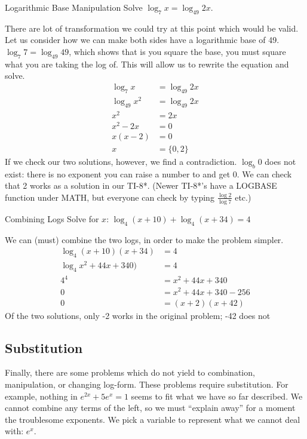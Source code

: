 \begin{example}{Logarithmic Base Manipulation}
\exProblem
Solve $\log_7{x} = \log_{49}{2x}$.

\exSolution
There are lot of transformation we could try at this point which would be valid.
Let us consider how we can make both sides have a logarithmic base of 49.
$\log_7{7} = \log_{49}{49}$, which shows that is you square the base, you must square
what you are taking the log of.  This will allow us to rewrite the equation and solve.
\begin{align*}
	\log_7{x} &= \log_{49}{2x}\\
	\log_{49}{x^2} &= \log_{49}{2x}\\
	x^2 &= 2x \\
	x^2 - 2x &= 0\\
	x(x-2) &= 0\\
	x &= \{0, 2\}
\end{align*}
If we check our two solutions, however, we find a contradiction.  $\log_b{0}$ does
not exist: there is no exponent you can raise a number to and get 0.  We can check that
2 works as a solution in our TI-8*.  (Newer TI-8*'s have a LOGBASE function under MATH, 
but everyone can check by typing $\frac{\log{2}}{\log{7}}$ etc.)
\end{example}

\begin{example}{Combining Logs}
\exProblem
Solve for $x$: $\log_4{(x+10)}+\log_4{(x+34)}=4$

\exSolution
We can (must) combine the two logs, in order to make the problem simpler.
\begin{align*}
	\log_4{(x+10)(x+34)} &= 4\\
	\log_4{x^2+44x+340)} &= 4\\
	4^4 &= x^2+44x+340\\
	0 &= x^2+44x+340-256\\
	0 &= (x+2)(x+42)
\end{align*}
Of the two solutions, only -2 works in the original problem; -42 does not
\end{example}

\subsection{Substitution}
Finally, there are some problems which do not yield to combination, manipulation, or
changing log-form.  These problems require substitution.  For example, nothing in 
$e^{2x}+5e^x=1$ seems to fit what we have so far described.  We cannot combine
any terms of the left, so we must ``explain away'' for a moment the troublesome
exponents.  We pick a variable to represent what we cannot deal with: $e^x$.  

